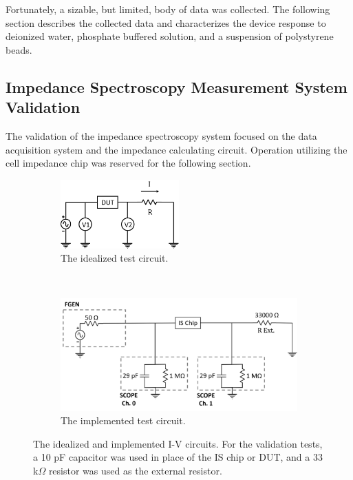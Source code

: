 \par Fortunately, a sizable, but limited, body of data was collected. The following section describes the collected data and characterizes the device response to deionized water, phosphate buffered solution, and a suspension of polystyrene beads.

\FloatBarrier


\clearpage

\subsection{Impedance Spectroscopy Measurement System Validation}

\par The validation of the impedance spectroscopy system focused on the data acquisition system and the impedance calculating circuit. Operation utilizing the cell impedance chip was reserved for the following section.

\begin{figure}[h]
\centering
    \begin{subfigure}[b]{\textwidth}
        \centering
        \includegraphics[width=0.5\textwidth]{images/I-VMethod.png}
        \caption{The idealized test circuit.}
        \label{fig:IS_DAQ_test_circuit_ideal}
    \end{subfigure}
    \\
    \vspace{0.1 in}
    \begin{subfigure}[b]{0.85\textwidth}
        \centering
        \includegraphics[width=\textwidth]{images/method_I-V.png}
        \caption{The implemented test circuit.}
        \label{fig:IS_DAQ_test_circuit_implemented}
    \end{subfigure}
    \caption{The idealized and implemented I-V circuits. For the validation tests, a 10 pF capacitor was used in place of the IS chip or DUT, and a 33 k$\Omega$ resistor was used as the external resistor.}
    \label{fig:IS_DAQ_test_circuit}
\end{figure}

